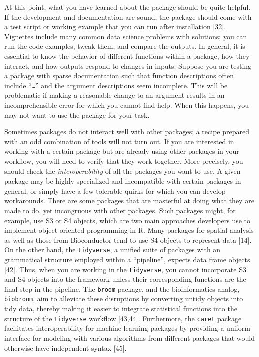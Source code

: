 \documentclass[10pt,letterpaper]{article}
\begin{document}
At this point, what you have learned about the package should be quite
helpful. If the development and documentation are sound, the package
should come with a test script or working example that you can run after
installation {[}32{]}. Vignettes include many common data science
problems with solutions; you can run the code examples, tweak them, and
compare the outputs. In general, it is essential to know the behavior of
different functions within a package, how they interact, and how outputs
respond to changes in inputs. Suppose you are testing a package with
sparse documentation such that function descriptions often include
``\texttt{\ldots{}}'' and the argument descriptions seem incomplete.
This will be problematic if making a reasonable change to an argument
results in an incomprehensible error for which you cannot find help.
When this happens, you may not want to use the package for your task.

Sometimes packages do not interact well with other packages; a recipe
prepared with an odd combination of tools will not turn out. If you are
interested in working with a certain package but are already using other
packages in your workflow, you will need to verify that they work
together. More precisely, you should check the \emph{interoperability}
of all the packages you want to use. A given package may be highly
specialized and incompatible with certain packages in general, or simply
have a few tolerable quirks for which you can develop workarounds. There
are some packages that are masterful at doing what they are made to do,
yet incongruous with other packages. Such packages might, for example,
use S3 or S4 objects, which are two main approaches developers use to
implement object-oriented programming in R. Many packages for spatial
analysis as well as those from Bioconductor tend to use S4 objects to
represent data {[}14{]}. On the other hand, the \texttt{tidyverse}, a
unified suite of packages with an grammatical structure employed within
a ``pipeline'', expects data frame objects {[}42{]}. Thus, when you are
working in the \texttt{tidyverse}, you cannot incorporate S3 and S4
objects into the framework unless their corresponding functions are the
final step in the pipeline. The \texttt{broom} package, and the
bioinformatics analog, \texttt{biobroom}, aim to alleviate these
disruptions by converting untidy objects into tidy data, thereby making
it easier to integrate statistical functions into the structure of the
\texttt{tidyverse} workflow {[}43,44{]}. Furthermore, the \texttt{caret}
package facilitates interoperability for machine learning packages by
providing a uniform interface for modeling with various algorithms from
different packages that would otherwise have independent syntax
{[}45{]}.
\end{document}
